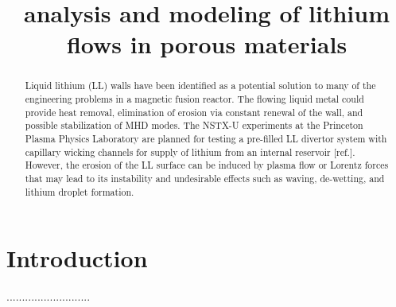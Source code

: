 \documentclass[
aps,%
12pt,%
final,%
notitlepage,%
oneside,%
onecolumn,%
nobibnotes,%
nofootinbib,%
superscriptaddress,%
noshowpacs,%
centertags
]%
{revtex4}
\begin{document}
%


\title{analysis and modeling of lithium flows in porous materials}
%
\author{ }
%
\author{ }
\noaffiliation
%
\begin{abstract}
Liquid lithium (LL) walls have been identified as a potential solution to many of the engineering problems in a magnetic fusion reactor. The flowing liquid metal could provide heat removal, elimination of erosion via constant renewal of the wall, and possible stabilization of MHD modes. The NSTX-U experiments at the Princeton Plasma Physics Laboratory are planned for testing a pre-filled LL divertor system with capillary wicking channels for supply of lithium from an internal reservoir [ref.]. However, the erosion of the LL surface can be induced by plasma flow or Lorentz forces that may lead to its instability and undesirable effects such as waving, de-wetting, and lithium droplet formation. 
\end{abstract}
%
\maketitle
%
\section{Introduction}
...........................
\end{document}

